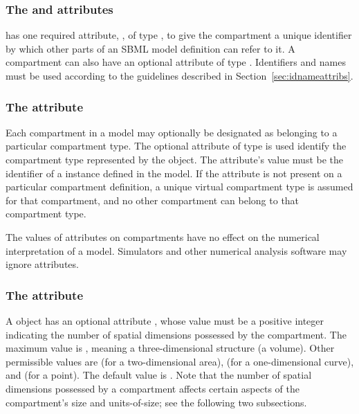 \subsubsection{The  and  attributes}

\Compartment has one required attribute, , of type
, to give the compartment a unique identifier by
which other parts of an SBML model definition can refer to it.  A
compartment can also have an optional  attribute of type
.  Identifiers and names must be used according
to the guidelines described in Section~\ref{sec:idnameattribs}.


\subsubsection{The  attribute}
\label{sec:compartment-compartment-type}

Each compartment in a model may optionally be designated as
belonging to a particular compartment type.  The optional attribute
 of type  is used identify
the compartment type represented by the \Compartment object.
The  attribute's value must be the identifier
of a \CompartmentType instance defined in the model.  If the
 attribute is not present on a particular
compartment definition, a unique virtual compartment type is
assumed for that compartment, and no other compartment can belong
to that compartment type.

\changed{}The values of  attributes on compartments
have no effect on the numerical interpretation of a model.
Simulators and other numerical analysis software may ignore
 attributes.


\subsubsection{The  attribute}

A \Compartment object has an optional attribute
, whose value must be a positive integer
indicating the number of spatial dimensions possessed by the
compartment.  The maximum value is , meaning a
three-dimensional structure (a volume).  Other permissible values
are  (for a two-dimensional area),  (for a
one-dimensional curve), and  (for a point).  The default
value is . Note that the number of spatial dimensions
possessed by a compartment affects certain aspects of the
compartment's size and units-of-size; see the following two
subsections.


